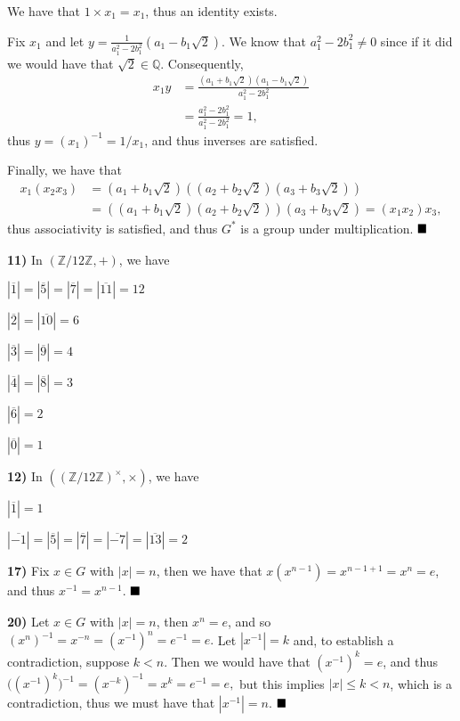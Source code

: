 \documentclass[12pt]{article}
\newcommand{\Z}{\mathbb{Z}}
\newcommand{\Q}{\mathbb{Q}}
\newcommand{\parenb}[1]{\left(#1\right)}
\newcommand{\vertb}[1]{\left\vert#1\right\vert}
\newcommand{\done}{\ensuremath{\strut\hfill\blacksquare}}
\begin{document}
We have that \( 1 \times x_1 = x_1 \), thus an identity exists.

Fix \( x_1 \) and let \( y = \frac{1}{a_1^2 - 2b_1^2}(a_1 - b_1\sqrt{2}) \).
We know that \( a_1^2 - 2b_1^2 \ne 0 \) since if it did we would have that
\( \sqrt{2} \in \Q \).
Consequently,
\begin{align*}
	x_1y
	& = \frac{(a_1 + b_1\sqrt{2})(a_1 - b_1\sqrt{2})}{a_1^2 - 2b_1^2} \\
	& = \frac{a_1^2 - 2b_1^2}{a_1^2 - 2b_1^2} = 1,
\end{align*}
thus \( y = (x_1)^{-1} = 1/x_1 \), and thus inverses are satisfied.

Finally, we have that
\begin{align*}
	x_1(x_2x_3)
	& = (a_1 + b_1\sqrt{2})
	\parenb{(a_2 + b_2\sqrt{2})(a_3 + b_3\sqrt{2})} \\
	& = \parenb{(a_1 + b_1\sqrt{2})(a_2 + b_2\sqrt{2})}
	(a_3 + b_3\sqrt{2}) = (x_1x_2)x_3,
\end{align*}
thus associativity is satisfied, and thus \( G^* \) is a group under
multiplication.
\done

\textbf{11)}
In \( \parenb{\Z / 12\Z, +} \), we have

\(
	\vertb{\overline{1}}
	= \vertb{\overline{5}}
	= \vertb{\overline{7}}
	= \vertb{\overline{11}}
	= 12
\)

\(
	\vertb{\overline{2}}
	= \vertb{\overline{10}}
	= 6
\)

\(
	\vertb{\overline{3}}
	= \vertb{\overline{9}}
	= 4
\)

\(
	\vertb{\overline{4}}
	= \vertb{\overline{8}}
	= 3
\)

\(
	\vertb{\overline{6}}
	= 2
\)

\(
	\vertb{\overline{0}}
	= 1
\)

\textbf{12)}
In \( \parenb{(\Z / 12\Z)^\times, \times} \), we have

\(
	\vertb{\overline{1}} = 1
\)

\(
	\vertb{\overline{-1}}
	= \vertb{\overline{5}}
	= \vertb{\overline{7}}
	= \vertb{\overline{-7}}
	= \vertb{\overline{13}}
	= 2
\)

\textbf{17)}
Fix \( x \in G \) with \( \vertb{x} = n \), then we have that
\( x(x^{n - 1}) = x^{n - 1 + 1} = x^n = e \), and thus
\( x^{-1} = x^{n - 1} \).
\done

\textbf{20)}
Let \( x \in G \) with \( \vertb{x} = n \), then \( x^n = e \), and so
\(
	\parenb{x^n}^{-1}
	= x^{-n}
	= \parenb{x^{-1}}^n
	= e^{-1}
	= e.
\)
Let \( \vertb{x^{-1}} = k \) and, to establish a contradiction, suppose
\( k < n \).
Then we would have that \( \parenb{x^{-1}}^k = e \), and thus
\(
	\big(\parenb{x^{-1}}^k\big)^{-1}
	= \parenb{x^{-k}}^{-1}
	= x^k
	= e^{-1}
	= e,
\)
but this implies \( \vertb{x} \leq k < n \), which is a contradiction, thus we
must have that \( \vertb{x^{-1}} = n \).
\done
\end{document}
